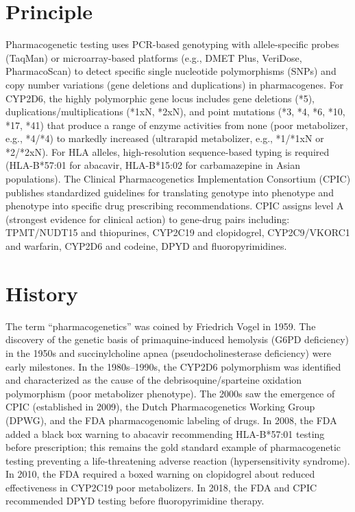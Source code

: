 \section*{Principle}
Pharmacogenetic testing uses PCR-based genotyping with allele-specific probes (TaqMan) or microarray-based platforms (e.g., DMET Plus, VeriDose, PharmacoScan) to detect specific single nucleotide polymorphisms (SNPs) and copy number variations (gene deletions and duplications) in pharmacogenes. For CYP2D6, the highly polymorphic gene locus includes gene deletions (*5), duplications/multiplications (*1xN, *2xN), and point mutations (*3, *4, *6, *10, *17, *41) that produce a range of enzyme activities from none (poor metabolizer, e.g., *4/*4) to markedly increased (ultrarapid metabolizer, e.g., *1/*1xN or *2/*2xN). For HLA alleles, high-resolution sequence-based typing is required (HLA-B*57:01 for abacavir, HLA-B*15:02 for carbamazepine in Asian populations). The Clinical Pharmacogenetics Implementation Consortium (CPIC) publishes standardized guidelines for translating genotype into phenotype and phenotype into specific drug prescribing recommendations. CPIC assigns level A (strongest evidence for clinical action) to gene-drug pairs including: TPMT/NUDT15 and thiopurines, CYP2C19 and clopidogrel, CYP2C9/VKORC1 and warfarin, CYP2D6 and codeine, DPYD and fluoropyrimidines.

\section*{History}
The term ``pharmacogenetics'' was coined by Friedrich Vogel in 1959. The discovery of the genetic basis of primaquine-induced hemolysis (G6PD deficiency) in the 1950s and succinylcholine apnea (pseudocholinesterase deficiency) were early milestones. In the 1980s--1990s, the CYP2D6 polymorphism was identified and characterized as the cause of the debrisoquine/sparteine oxidation polymorphism (poor metabolizer phenotype). The 2000s saw the emergence of CPIC (established in 2009), the Dutch Pharmacogenetics Working Group (DPWG), and the FDA pharmacogenomic labeling of drugs. In 2008, the FDA added a black box warning to abacavir recommending HLA-B*57:01 testing before prescription; this remains the gold standard example of pharmacogenetic testing preventing a life-threatening adverse reaction (hypersensitivity syndrome). In 2010, the FDA required a boxed warning on clopidogrel about reduced effectiveness in CYP2C19 poor metabolizers. In 2018, the FDA and CPIC recommended DPYD testing before fluoropyrimidine therapy.

